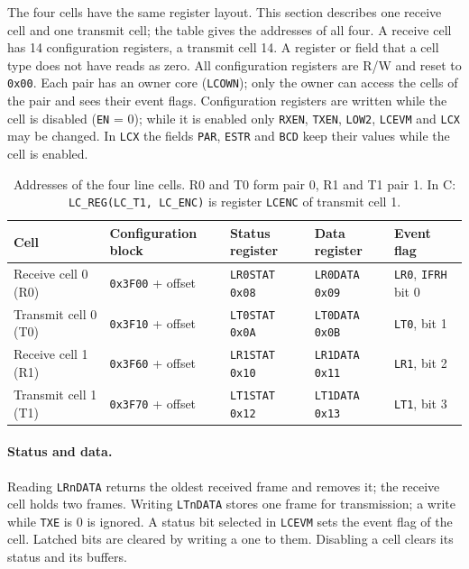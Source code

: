 \documentclass[10pt,a4paper]{article}
\newcommand{\reg}[1]{\texttt{#1}}
\begin{document}
The four cells have the same register layout. This section describes one receive cell and one transmit cell;
the table gives the addresses of all four. A receive cell has 14 configuration registers, a transmit cell 14.
A register or field that a cell type does not have reads as zero. All configuration registers are R/W and
reset to \texttt{0x00}. Each pair has an owner core (\reg{LCOWN}); only the owner can access the cells of the pair
and sees their event flags. Configuration registers are written while the cell is disabled (\reg{EN} = 0);
while it is enabled only \reg{RXEN}, \reg{TXEN}, \reg{LOW2}, \reg{LCEVM} and \reg{LCX} may be changed. In \reg{LCX} the fields \reg{PAR}, \reg{ESTR} and \reg{BCD} keep their values while the cell is enabled.

\begin{table}[H]
\centering\small
\begin{tabular}{@{}lllll@{}}
\toprule
Cell & Configuration block & Status register & Data register & Event flag \\
\midrule
Receive cell 0 (R0) & \texttt{0x3F00} + offset & \texttt{LR0STAT} \texttt{0x08} & \texttt{LR0DATA} \texttt{0x09} & \texttt{LR0}, \reg{IFRH} bit 0 \\
Transmit cell 0 (T0) & \texttt{0x3F10} + offset & \texttt{LT0STAT} \texttt{0x0A} & \texttt{LT0DATA} \texttt{0x0B} & \texttt{LT0}, bit 1 \\
Receive cell 1 (R1) & \texttt{0x3F60} + offset & \texttt{LR1STAT} \texttt{0x10} & \texttt{LR1DATA} \texttt{0x11} & \texttt{LR1}, bit 2 \\
Transmit cell 1 (T1) & \texttt{0x3F70} + offset & \texttt{LT1STAT} \texttt{0x12} & \texttt{LT1DATA} \texttt{0x13} & \texttt{LT1}, bit 3 \\
\bottomrule
\end{tabular}
\caption{Addresses of the four line cells. R0 and T0 form pair 0, R1 and T1 pair 1. In C:
\texttt{LC\_REG(LC\_T1, LC\_ENC)} is register \texttt{LCENC} of transmit cell 1.}
\end{table}

\paragraph{Status and data.} Reading \reg{LRnDATA} returns the oldest received frame and removes it; the receive
cell holds two frames. Writing \reg{LTnDATA} stores one frame for transmission; a write while \reg{TXE} is 0 is
ignored. A status bit selected in \reg{LCEVM} sets the event flag of the cell. Latched bits are cleared by writing a
one to them. Disabling a cell clears its status and its buffers.
\end{document}
